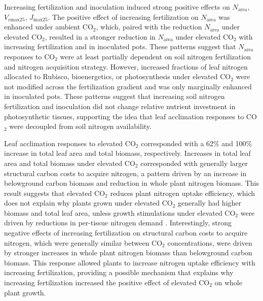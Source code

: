 Increasing fertilization and inoculation induced strong positive effects on $N_\mathrm{area}$, $V_\mathrm{cmax25}$, $J_\mathrm{max25}$. The positive effect of increasing fertilization on $N_\mathrm{area}$ was enhanced under ambient CO$_2$, which, paired with the  reduction $N_\mathrm{area}$ under elevated CO$_2$, resulted in a stronger reduction in $N_\mathrm{area}$ under elevated CO$_2$ with increasing fertilization and in inoculated pots. These patterns suggest that $N_\mathrm{area}$ responses to CO$_2$ were at least partially dependent on soil nitrogen fertilization and nitrogen acquisition strategy. However, increased fractions of leaf nitrogen allocated to Rubisco, bioenergetics, or photosynthesis under elevated CO$_2$ were not modified across the fertilization gradient and was only marginally enhanced in inoculated pots. These patterns suggest that increasing soil nitrogen fertilization and inoculation did not change relative nutrient investment in photosynthetic tissues, supporting the idea that leaf acclimation responses to CO$_2$ were decoupled from soil nitrogen availability.

Leaf acclimation responses to elevated CO$_2$ corresponded with a 62\% and 100\% increase in total leaf area and total biomass, respectively. Increases in total leaf area and total biomass under elevated CO$_2$ corresponded with generally larger structural carbon costs to acquire nitrogen, a pattern driven by an increase in belowground carbon biomass and reduction in whole plant nitrogen biomass. This result suggests that elevated CO$_2$ reduces plant nitrogen uptake efficiency, which does not explain why plants grown under elevated CO$_2$ generally had higher biomass and total leaf area, unless growth stimulations under elevated CO$_2$ were driven by reductions in per-tissue nitrogen demand . Interestingly, strong negative effects of increasing fertilization on structural carbon costs to acquire nitrogen, which were generally similar between CO$_2$ concentrations, were driven by stronger increases in whole plant nitrogen biomass than belowground carbon biomass. This response allowed plants to increase nitrogen uptake efficiency with increasing fertilization, providing a possible mechanism that explains why increasing fertilization increased the positive effect of elevated CO$_2$ on whole plant growth.

